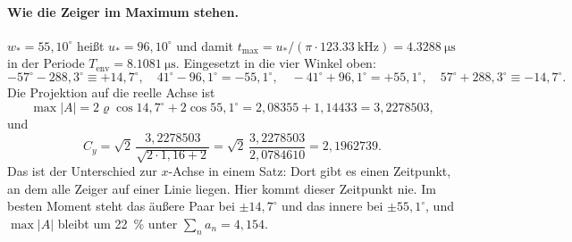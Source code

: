 \documentclass[11pt,a4paper]{article}
\newcommand{\crest}{\ensuremath{C}}
\begin{document}
\paragraph{Wie die Zeiger im Maximum stehen.}
$w_*=55{,}10^\circ$ heißt $u_*=96{,}10^\circ$ und damit
$t_\mathrm{max} = u_*/(\pi\cdot\SI{123.33}{\kilo\hertz}) = \SI{4.3288}{\micro\second}$
in der Periode $T_\mathrm{env}=\SI{8.1081}{\micro\second}$. Eingesetzt in die
vier Winkel oben:
\begin{equation}
  -57^\circ-288{,}3^\circ \equiv +14{,}7^\circ,\quad
  41^\circ-96{,}1^\circ = -55{,}1^\circ,\quad
  -41^\circ+96{,}1^\circ = +55{,}1^\circ,\quad
  57^\circ+288{,}3^\circ \equiv -14{,}7^\circ .
\end{equation}
Die Projektion auf die reelle Achse ist
\begin{equation}
  \max|A| = 2\varrho\cos14{,}7^\circ + 2\cos55{,}1^\circ
          = 2{,}08355 + 1{,}14433 = 3{,}2278503 ,
\end{equation}
und
\begin{equation}
  \crest_y = \sqrt2\,\frac{3{,}2278503}{\sqrt{2\cdot1{,}16+2}}
           = \sqrt2\,\frac{3{,}2278503}{2{,}0784610} = 2{,}1962739 .
\end{equation}
Das ist der Unterschied zur $x$-Achse in einem Satz: Dort gibt es einen
Zeitpunkt, an dem alle Zeiger auf einer Linie liegen. Hier kommt dieser
Zeitpunkt nie. Im besten Moment steht das äußere Paar bei $\pm14{,}7^\circ$
und das innere bei $\pm55{,}1^\circ$, und $\max|A|$ bleibt um
\SI{22}{\percent} unter $\sum_n a_n = 4{,}154$.
\end{document}
